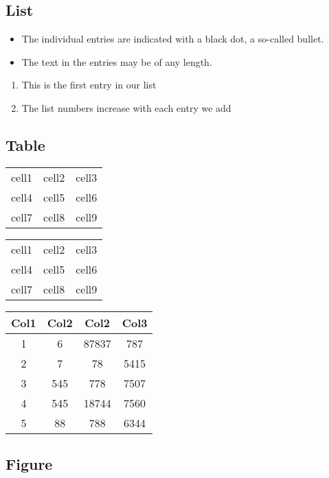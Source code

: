 \documentclass{article}
\begin{document}
\subsection{List}
\begin{itemize}
  \item The individual entries are indicated with a black dot, a so-called bullet.
  \item The text in the entries may be of any length.
\end{itemize}
\begin{enumerate}
  \item This is the first entry in our list
  \item The list numbers increase with each entry we add
\end{enumerate}

\subsection{Table}
\begin{center}
\begin{tabular}{ l c r }
 cell1 & cell2 & cell3 \\ 
 cell4 & cell5 & cell6 \\  
 cell7 & cell8 & cell9    
\end{tabular}
\end{center}

\begin{center}
\begin{tabular}{ |c|c|c| } 
 \hline
 cell1 & cell2 & cell3 \\ 
 cell4 & cell5 & cell6 \\ 
 cell7 & cell8 & cell9 \\ 
 \hline
\end{tabular}
\end{center}

\begin{center}
 \begin{tabular}{||c c c c||} 
 \hline
 Col1 & Col2 & Col2 & Col3 \\ [0.5ex] 
 \hline\hline
 1 & 6 & 87837 & 787 \\ 
 \hline
 2 & 7 & 78 & 5415 \\
 \hline
 3 & 545 & 778 & 7507 \\
 \hline
 4 & 545 & 18744 & 7560 \\
 \hline
 5 & 88 & 788 & 6344 \\ [1ex] 
 \hline
\end{tabular}
\end{center}

\subsection{Figure}
\end{document}

